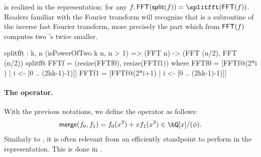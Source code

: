  
 \begin{algorithm}%
 \caption{$\splitfft(\fft(f))$}\label{alg:splitfft}
  \begin{algorithmic}[1]
  \EndFor
  \end{algorithmic}
 \end{algorithm}
 
 \splitfft is \polsplit realized in the \fft representation: for any $f, \fft(\polsplit(f)) = \splitfft(\fft(f))$. Readers familiar with the Fourier transform will recognize that \splitfft is a subroutine of the inverse fast Fourier transform, more precisely the part which from $\textsf{FFT}(f)$ computes two \fft's twice smaller.

\begin{code}
  splitfft : {k, n} (isPowerOfTwo k n, n > 1) =>
    (FFT n) -> (FFT (n/2), FFT (n/2))
  splitfft FFTf = (resize(FFTf0), resize(FFTf1)) where
    FFTf0 = [FFTf@(2*i  ) | i <- [0 .. (2^^(k-1)-1)]]
    FFTf1 = [FFTf@(2*i+1) | i <- [0 .. (2^^(k-1)-1)]]
\end{code}

 \paragraph{The \mergefft operator.} With the previous notations, we define the operator \polmerge as follows:
 \begin{equation}\label{eq:merge}
 \polmerge(f_0,f_1) = f_0(x^2) + xf_1(x^2) \in \bQ[x]/(\phi).
 \end{equation}
 Similarly to \polsplit, it is often relevant from an efficiently standpoint to perform \polmerge in the \fft representation. This is done in \longmergefft.
 
 \begin{algorithm}%
 \caption{$\mergefft(f_0,f_1)$}\label{alg:mergefft}
  \begin{algorithmic}[1]
  \EndFor
  \end{algorithmic}
 \end{algorithm}

